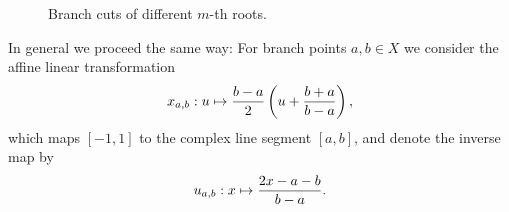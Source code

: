 \documentclass[main.tex]{subfiles}
\begin{document}
  \begin{figure}[H]
      \begin{center}
      \end{center}
      \caption{Branch cuts of different $m$-th roots.}
  \label{fig:mth_root_pol} \end{figure}

  In general we proceed the same way: For branch points $a,b \in X$ we consider the affine linear
  transformation
  \begin{equation}
      \label{def:xab}
      x_{a,b} : u \mapsto \frac{b-a}{2}\left(u+\frac{b+a}{b-a}\right),
  \end{equation}
  which maps $[-1,1]$ to the complex line segment $[a,b]$, and denote the inverse map by
  \begin{equation}
      \label{def:uab}
      u_{a,b} : x \mapsto \frac{2x-a-b}{b-a}.
  \end{equation}
\end{document}
